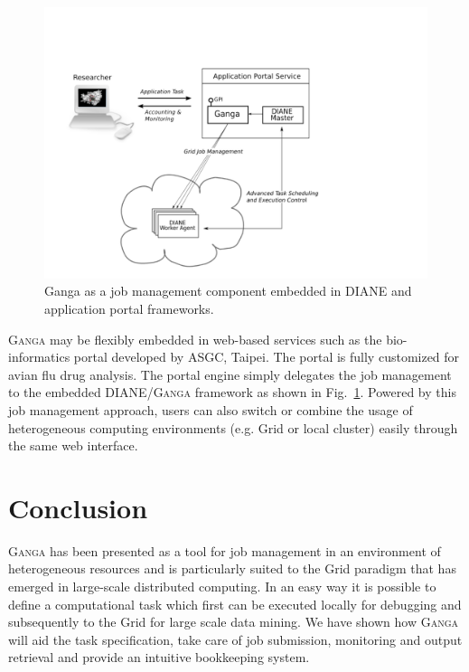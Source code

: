 \documentclass{elsart}
\def\ganga {\textsc{Ganga}\xspace}
\def\diane {\textsc{DIANE}\xspace}
\def\grid {Grid\xspace}
\begin{document}
\begin{figure}[h!]
  \centering
  \includegraphics[width=1 \textwidth]{ganga-diane-portal.pdf}
  \caption{Ganga as a job management component embedded in DIANE and
    application portal frameworks.}
  \label{fig:webportal}
\end{figure}
\ganga may be flexibly embedded in web-based services such as the
bio-informatics portal developed by ASGC, Taipei. The portal is fully
customized for avian flu drug analysis.  The portal engine simply delegates
the job management to the embedded \diane/\ganga framework as shown in
Fig.~\ref{fig:webportal}. Powered by this job management approach, users can
also switch or combine the usage of heterogeneous computing environments (e.g.
\grid or local cluster) easily through the same web interface.

\section{Conclusion}
\label{sec:conclusion}
\ganga has been presented as a tool for job management in an environment of heterogeneous resources
and is particularly suited to the \grid paradigm that has emerged in large-scale distributed computing.
In an easy way it is possible to define a
computational task which first can be executed locally for debugging and
subsequently to the \grid for large scale data mining. We have shown how \ganga
will aid the task specification, take care of job submission, monitoring and
output retrieval and provide an intuitive bookkeeping system.
\end{document}
